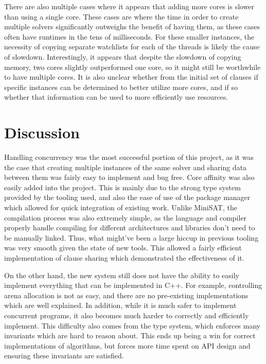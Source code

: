 \documentclass[11pt]{extarticle}
\begin{document}
There are also multiple cases where it appears that adding more cores is slower than using a
single core. These cases are where the time in order to create multiple solvers significantly
outweighs the benefit of having them, as these cases often have runtimes in the tens of
milliseconds. For these smaller instances, the necessity of copying separate watchlists for each
of the threads is likely the cause of slowdown. Interestingly, it appears that despite the
slowdown of copying memory, two cores slightly outperformed one core, so it might still be
worthwhile to have multiple cores. It is also unclear whether from the initial set of clauses if
specific instances can be determined to better utilize more cores, and if so whether that
information can be used to more efficiently use resources.

\section*{Discussion}
Handling concurrency was the most successful portion of this project, as it was the case that
creating multiple instances of the same solver and sharing data between them was fairly easy to
implement and bug free. Core affinity was also easily added into the project. This is mainly due
to the strong type system provided by the tooling used, and also the ease of use of the package
manager which allowed for quick integration of existing work. Unlike MiniSAT, the compilation
process was also extremely simple, as the language and compiler properly handle compiling for
different architectures and libraries don't need to be manually linked. Thus, what might've been
a large hiccup in previous tooling was very smooth given the state of new tools. This allowed a
fairly efficient implementation of clause sharing which demonstrated the effectiveness of it.

On the other hand, the new system still does not have the ability to easily implement everything
that can be implemented in C++. For example, controlling arena allocation is not as easy, and
there are no pre-existing implementations which are well explained. In addition, while it is
much safer to implement concurrent programs, it also becomes much harder to correctly and
efficiently implement. This difficulty also comes from the type system, which enforces many
invariants which are hard to reason about. This ends up being a win for correct implementations
of algorithms, but forces more time spent on API design and ensuring these invariants are
satisfied.
\end{document}
